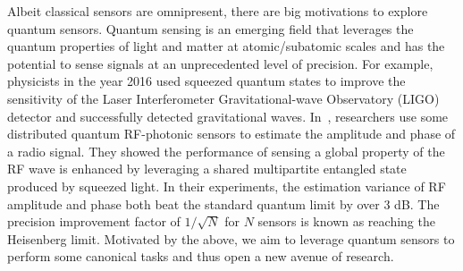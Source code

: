 
Albeit classical sensors are omnipresent, there are big motivations to explore quantum sensors.
Quantum sensing is an emerging field that leverages the quantum properties of light and matter at atomic/subatomic scales and has the potential to sense signals at an unprecedented level of precision.
For example, physicists in the year 2016 used squeezed quantum states to improve the sensitivity of the Laser Interferometer Gravitational-wave Observatory (LIGO) detector and successfully detected gravitational waves.
In~\cite{PRL20-qsn}, researchers use some distributed quantum RF-photonic sensors to estimate the amplitude and phase of a radio signal.
They showed the performance of sensing a global property of the RF wave is enhanced by leveraging a shared multipartite entangled state produced by squeezed light.
In their experiments, the estimation variance of RF amplitude and phase both beat the standard quantum limit by over 3 dB.
The precision improvement factor of $1/\sqrt{N}$ for $N$ sensors is known as reaching the Heisenberg limit.
Motivated by the above, we aim to leverage quantum sensors to perform some canonical tasks and thus open a new avenue of research.


